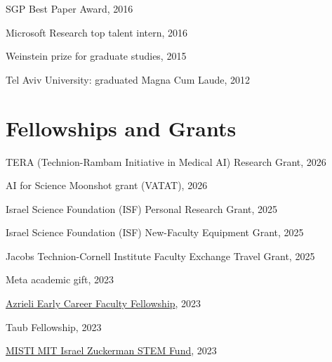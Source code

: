 \documentclass[margin,line]{res}
\begin{document}
\begin{resume}
\vspace*{-2.5mm}
SGP Best Paper Award, 2016



\vspace*{-2.5mm}
Microsoft Research top talent intern, 2016 

\vspace*{-2.5mm}
Weinstein prize for graduate studies, 2015


\vspace*{-2.5mm}
Tel Aviv University: graduated Magna Cum Laude, 2012


\section{\sc Fellowships and Grants}

TERA (Technion-Rambam Initiative in Medical AI) Research Grant, 2026
\vspace*{-2.5mm} %

AI for Science Moonshot grant (VATAT), 2026
\vspace*{-2.5mm} %

Israel Science Foundation (ISF) Personal Research Grant, 2025
\vspace*{-2.5mm} %

Israel Science Foundation (ISF) New-Faculty Equipment Grant, 2025
\vspace*{-2.5mm} %

Jacobs Technion-Cornell Institute Faculty Exchange Travel Grant, 2025 %
\vspace*{-2.5mm}

Meta academic gift, 2023
\vspace*{-2.5mm}

\href{https://www.google.com}{Azrieli Early Career Faculty Fellowship}, 2023 

\vspace*{-2.5mm}
Taub Fellowship, 2023

\vspace*{-2.5mm}
\href{https://misti.mit.edu/mit-israel-past-seed-fund-winners#:~:text=Or%20Litany%2C%20Technion%20%2D%20Israel%20Institute%20of%20Technology}{MISTI MIT Israel Zuckerman STEM Fund}, 2023


\end{resume}
\end{document}
